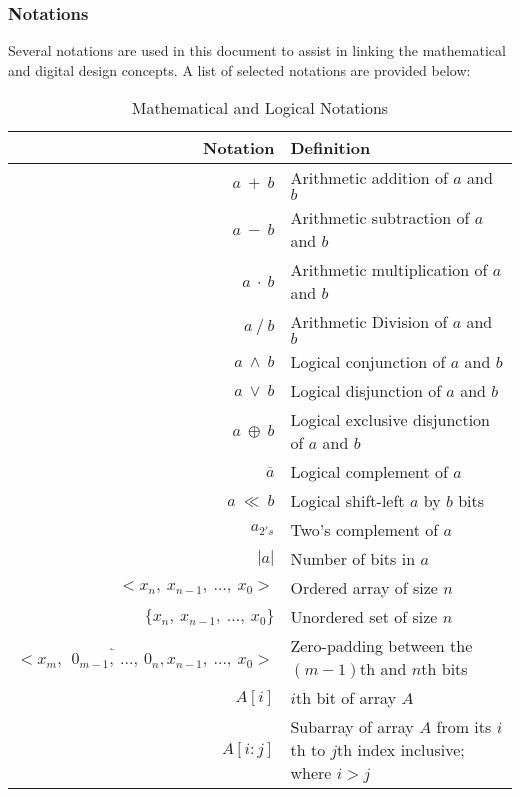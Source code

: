         \subsubsection{Notations} Several notations are used in this document
        to assist in linking the mathematical and digital design concepts. A
        list of selected notations are provided below:

        \begin{table}[!h]
            \def\arraystretch{2}
            \caption{Mathematical and Logical Notations}

            \centering
            \begin{tabular*}{470pt}{@{\extracolsep{\fill}} r p{9cm}}

            \textbf{Notation} & \textbf{Definition} \\
            \hline
            $a \ + \ b$ & Arithmetic addition of $a$ and $b$\\
            $a \ - \ b$ & Arithmetic subtraction of $a$ and $b$\\
            $a \ \cdot \ b$ & Arithmetic multiplication of $a$ and $b$\\
            $a \ / \ b$ & Arithmetic Division of $a$ and $b$\\
            $a \ \wedge \ b$ & Logical conjunction of $a$ and $b$\\
            $a \ \vee \ b$ & Logical disjunction of $a$ and $b$\\
            $a \ \oplus \ b$ & Logical exclusive disjunction of $a$ and $b$\\
            $\overline{a}$ & Logical complement of $a$\\
            $a \ \ll \ b$ & Logical shift-left $a$ by $b$ bits\\
            $a_{2's}$ & Two's complement of $a$\\
            $|a|$ & Number of bits in $a$\\
            $<x_{n}, \ x_{n-1}, \ \ldots, \ x_{0}>$ & Ordered array of size $n$
            \\
            $\{x_{n}, \ x_{n-1}, \ \ldots, \ x_{0}\}$ & Unordered set of size
            $n$ \\
            $< x_{m}, \ \ \overleftarrow{0_{m-1}, \ \ldots, \ 0_{n}}, x_{n-1},
            \
            \ldots, \ x_{0} >$ & Zero-padding between the $(m-1)$th and $n$th
            bits \\
            $A[i]$ & $i$th bit of array $A$ \\
            $A[i:j]$ & Subarray of array $A$ from its $i$th to $j$th index
            inclusive; where $i > j$ \\

            \end{tabular*}
        \end{table}


    \newpage
